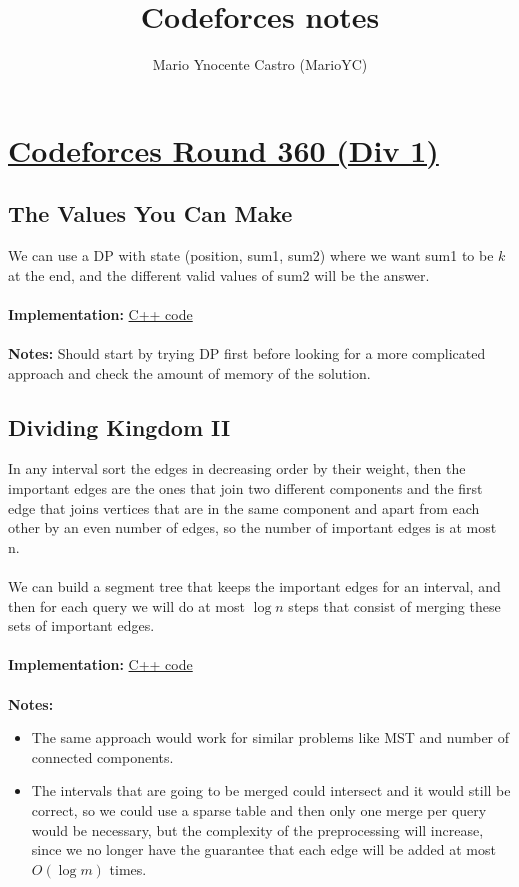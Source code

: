 \documentclass[a4paper,12pt]{article}
\title{Codeforces notes}
\author{Mario Ynocente Castro (MarioYC)}
\date{}
\begin{document}
\maketitle
\thispagestyle{empty}

\newpage
\tableofcontents

\newpage
\section{\href{http://codeforces.com/contest/687}{Codeforces Round 360 (Div 1)}}

\subsection{The Values You Can Make}

We can use a DP with state (position, sum1, sum2) where we want sum1 to be $k$ at the end, and the different valid values of sum2 will be the answer.
\\ \\
\textbf{Implementation:} \href{http://codeforces.com/contest/687/submission/19365759}{C++ code}
\\ \\
\textbf{Notes:} Should start by trying DP first before looking for a more complicated approach and check the amount of memory of the solution.

\subsection{Dividing Kingdom II}

In any interval sort the edges in decreasing order by their weight, then the important edges are the ones that join two different components and the first edge that joins vertices that are in the same component and apart from each other by an even number of edges, so the number of important edges is at most n.
\\ \\
We can build a segment tree that keeps the important edges for an interval, and then for each query we will do at most $\log n$ steps that consist of merging these sets of important edges.
\\ \\
\textbf{Implementation:} \href{http://codeforces.com/contest/687/submission/19196725}{C++ code}
\\ \\
\textbf{Notes:}
\begin{itemize}
\item
The same approach would work for similar problems like MST and number of connected components.
\item
The intervals that are going to be merged could intersect and it would still be correct, so we could use a sparse table and then only one merge per query would be necessary, but the complexity of the preprocessing will increase, since we no longer have the guarantee that each edge will be added at most $O(\log m)$ times.
\end{itemize}
\end{document}
